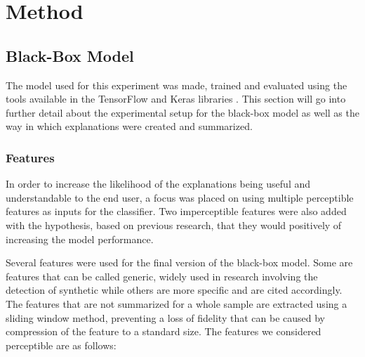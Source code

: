 \documentclass{article}
\begin{document}
	\section{Method}
	\label{sec:method}
		\subsection{Black-Box Model}
		The model used for this experiment was made, trained and evaluated using the tools
		available in the TensorFlow and Keras libraries \cite{tensorflow2015-whitepaper}. This
		section will go into further detail about the experimental setup for the black-box model
		as well as the way in which explanations were created and summarized.
			\subsubsection{Features}
			In order to increase the likelihood of the explanations being useful and
			understandable to the end user, a focus was placed on using multiple perceptible
			features as inputs for the classifier. Two imperceptible features were also added with
			the hypothesis, based on previous research, that they would positively of increasing
			the model performance.
			\par
			Several features were used for the final version of the black-box model. Some are
			features that can be called generic, widely used in research involving the detection
			of synthetic while others are more specific and are cited accordingly. The features
			that are not summarized for a whole sample are extracted using a sliding window method,
			preventing a loss of fidelity that can be caused by compression of the feature to a
			standard size. The features we considered perceptible are as follows:
\end{document}
